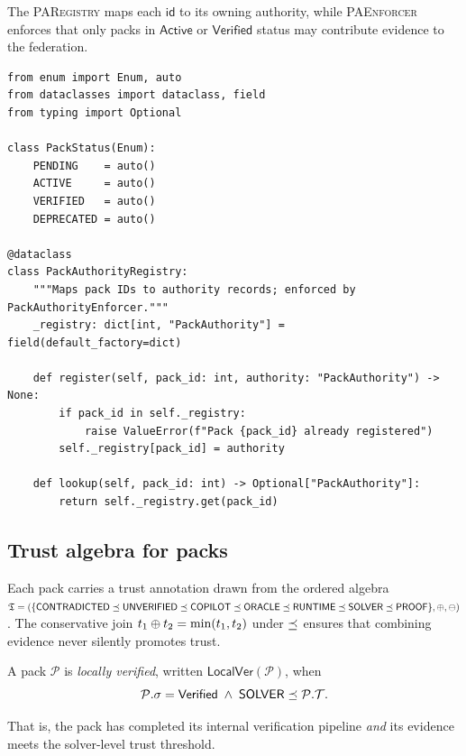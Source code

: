 \documentclass[11pt]{article}
\newcommand{\Pack}{\mathcal{P}}
\newcommand{\PackId}{\mathsf{id}}
\newcommand{\PackSt}{\sigma}
\newcommand{\LocalVer}{\mathsf{LocalVer}}
\newcommand{\PAR}{\textsc{PARegistry}}
\newcommand{\PAE}{\textsc{PAEnforcer}}
\begin{document}
The \PAR{} maps each $\PackId$ to its owning authority, while \PAE{}
enforces that only packs in $\mathsf{Active}$ or $\mathsf{Verified}$
status may contribute evidence to the federation.

\begin{lstlisting}[style=jugeo-python, caption={PackStatus enum and PackAuthorityRegistry skeleton.}]
from enum import Enum, auto
from dataclasses import dataclass, field
from typing import Optional

class PackStatus(Enum):
    PENDING    = auto()
    ACTIVE     = auto()
    VERIFIED   = auto()
    DEPRECATED = auto()

@dataclass
class PackAuthorityRegistry:
    """Maps pack IDs to authority records; enforced by PackAuthorityEnforcer."""
    _registry: dict[int, "PackAuthority"] = field(default_factory=dict)

    def register(self, pack_id: int, authority: "PackAuthority") -> None:
        if pack_id in self._registry:
            raise ValueError(f"Pack {pack_id} already registered")
        self._registry[pack_id] = authority

    def lookup(self, pack_id: int) -> Optional["PackAuthority"]:
        return self._registry.get(pack_id)
\end{lstlisting}

\subsection{Trust algebra for packs}

Each pack carries a trust annotation drawn from the ordered algebra
$\mathfrak{T} = (\{\mathsf{CONTRADICTED} \preceq \mathsf{UNVERIFIED} \preceq \mathsf{COPILOT} \preceq \mathsf{ORACLE}
            \preceq \mathsf{RUNTIME} \preceq \mathsf{SOLVER} \preceq \mathsf{PROOF}\},
           \oplus, \ominus)$.
The conservative join $t_1 \oplus t_2 = \min(t_1, t_2)$ under $\preceq$
ensures that combining evidence never silently promotes trust.

\begin{definition}
\label{def:local-ver}
A pack $\Pack$ is \emph{locally verified}, written $\LocalVer(\Pack)$,
when
\[
  \Pack.\PackSt = \mathsf{Verified}
  \;\wedge\;
  \Tsolver \tleq \Pack.\trust.
\]
\end{definition}

That is, the pack has completed its internal verification pipeline
\emph{and} its evidence meets the solver-level trust threshold.

\end{document}
